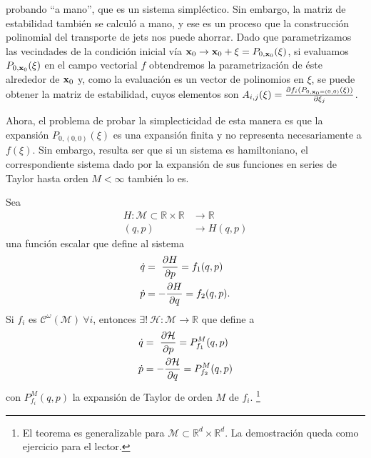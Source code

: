 probando ``a mano'', que es un sistema simpléctico. Sin embargo, la matriz de estabilidad también se calculó a mano, y ese es un proceso que la construcción polinomial del transporte de jets nos puede ahorrar. Dado que parametrizamos las vecindades de la condición inicial vía $\mathbf{x}_0 \to \mathbf{x}_0 + \xi = P_{0,\mathbf{x}_0}(\xi)$, si evaluamos $P_{0,\mathbf{x}_0}(\xi)$ en el campo vectorial $f$ obtendremos la parametrización de éste alrededor de $\mathbf{x}_0$ y, como la evaluación es un vector de polinomios en $\xi$, se puede obtener la matriz de estabilidad, cuyos elementos son $A_{i,j}(\xi) = \frac{\partial f_i(P_{0,\mathbf{x}_0=(0,0)}(\xi))}{\partial \xi_j}$.

Ahora, el problema de probar la simplecticidad de esta manera es que la expansión $P_{0,(0,0)}(\xi)$ es una expansión finita y no representa necesariamente a $f(\xi)$. Sin embargo, resulta ser que si un sistema es hamiltoniano, el correspondiente sistema dado por la expansión de sus funciones en series de Taylor hasta orden $M < \infty$ también lo es.

\begin{teorema}
Sea 
\begin{align*}
  H: \mathcal{M} \subset \mathbb{R} \times\mathbb{R} &\to \mathbb{R} \\ 
  (q,p) &\to H(q,p)
\end{align*}
una función escalar que define al sistema
\begin{align}
 \dot{q} &= \ \frac{\partial H}{\partial p} = f_1(q,p) \nonumber \\
 \dot{p} &= - \frac{\partial H}{\partial q} = f_2(q,p).
 \label{eq:theorem_ode}
\end{align}
Si $f_i$ es $\mathcal{C}^\omega(\mathcal{M}) \ \forall i$, entonces $\exists! \  \mathcal{H}: \mathcal{M} \to \mathbb{R}$ que define a
\begin{align*}
 \dot{q} &= \ \frac{\partial \mathcal{H}}{\partial p} = P_{f_1}^M(q,p) \\
 \dot{p} &= - \frac{\partial \mathcal{H}}{\partial q} = P_{f_2}^M(q,p)
\end{align*}
con $P_{f_i}^M(q,p)$ la expansión de Taylor de orden $M$ de $f_i$.
\footnote{El teorema es generalizable para $\mathcal{M} \subset \mathbb{R}^d \times \mathbb{R}^d$. La demostración queda como ejercicio para el lector.}
\end{teorema}

